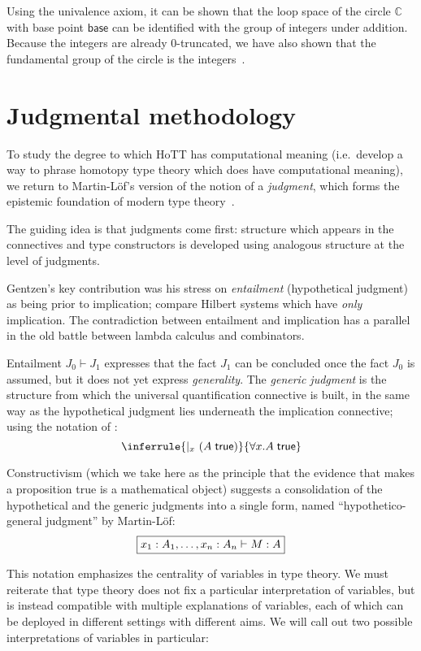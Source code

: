 \documentclass{article}
\newcommand\Circle{\mathbb{C}}
\newcommand\Base{\mathsf{base}}
\DeclarePairedDelimiter\Parens{\lparen}{\rparen}
\begin{document}
Using the univalence axiom, it can be shown that the loop space of the
circle $\Circle$ with base point $\Base$ can be identified with the
group of integers under addition. Because the integers are already
0-truncated, we have also shown that the fundamental group of the
circle is the integers~\citep{Licata:13}.


\section{Judgmental methodology}

To study the degree to which HoTT has computational meaning (i.e.\
develop a way to phrase homotopy type theory which does have
computational meaning), we return to Martin-L\"of's version of the
notion of a \emph{judgment}, which forms the epistemic foundation of
modern type theory~\citep{MartinLof:87,MartinLof:94,MartinLof:96}.

The guiding idea is that judgments come first: structure which appears
in the connectives and type constructors is developed using analogous
structure at the level of judgments.

Gentzen's key contribution was his stress on \emph{entailment}
(hypothetical judgment) as being prior to implication; compare Hilbert
systems which have \emph{only} implication. The contradiction between
entailment and implication has a parallel in the old battle between
lambda calculus and combinators.

Entailment $J_0\vdash J_1$ expresses that the fact $J_1$ can be
concluded once the fact $J_0$ is assumed, but it does not yet express
\emph{generality}. The \emph{generic judgment} is the structure from
which the universal quantification connective is built, in the same
way as the hypothetical judgment lies underneath the implication
connective; using the notation of \citet{MartinLof:notes:87}:
\[
  \inferrule{
    \vert_x\ \Parens*{\trueF{A}}
  }{
    \trueF{\forall x.A}
  }
\]

Constructivism (which we take here as the principle that the evidence
that makes a proposition true is a mathematical object) suggests a
consolidation of the hypothetical and the generic judgments into a
single form, named ``hypothetico-general judgment'' by Martin-L\"of:
\[
  \framebox{$\hasEF{x_1:A_1,\ldots,x_n:A_n}{M}{A}$}
\]

This notation emphasizes the centrality of variables in type
theory. We must reiterate that type theory does not fix a particular
interpretation of variables, but is instead compatible with multiple
explanations of variables, each of which can be deployed in different
settings with different aims. We will call out two possible
interpretations of variables in particular:
\end{document}
